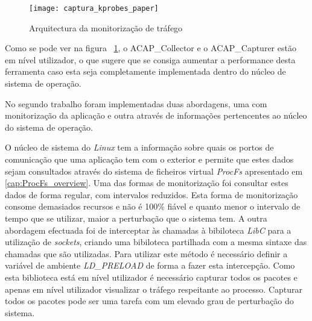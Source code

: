 \begin{figure}[h!]
       \centering
       \texttt{[image: captura\_kprobes\_paper]}
       \caption{Arquitectura da monitorização de tráfego}
	\label{fig:paper_capture_kprobes}
\end{figure}


Como se pode ver na figura ~\ref{fig:paper_capture_kprobes}, o ACAP\_Collector e o ACAP\_Capturer estão em nível utilizador, o que sugere que se consiga aumentar a performance desta ferramenta caso esta seja completamente implementada dentro do núcleo de sistema de operação.

No segundo trabalho foram implementadas duas abordagens, uma com monitorização da aplicação e outra através de informações pertencentes ao núcleo do sistema de operação.

O núcleo de sistema do \textit{Linux} tem a informação sobre quais os portos de comunicação que uma aplicação tem com o exterior e permite que estes dados sejam consultados através do sistema de ficheiros virtual \textit{ProcFs} apresentado em \ref{cap:ProcFs_overview}. Uma das formas de monitorização foi consultar estes dados de forma regular, com intervalos reduzidos. Esta forma de monitorização consome demasiados recursos e não é 100\% fiável e quanto menor o intervalo de tempo que se utilizar, maior a perturbação que o sistema tem.
A outra abordagem efectuada foi de interceptar às chamadas à bibiloteca \textit{LibC} para a utilização de \textit{sockets}, criando uma bibiloteca partilhada com a mesma sintaxe das chamadas que são utilizadas. Para utilizar este método é necessário definir a variável de ambiente \textit{LD\_PRELOAD} de forma a fazer esta intercepção. Como esta biblioteca está em nível utilizador é necessário capturar todos os pacotes e apenas em nível utilizador visualizar o tráfego respeitante ao processo. Capturar todos os pacotes pode ser uma tarefa com um elevado grau de perturbação do sistema. 